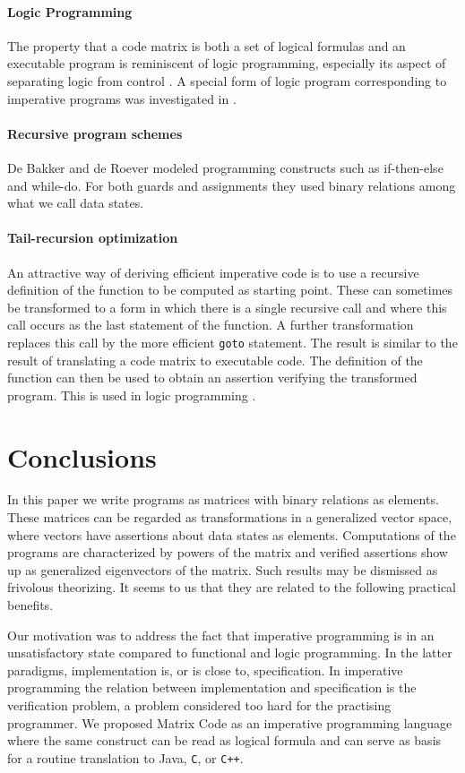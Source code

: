 \documentclass[preprint,11pt]{elsarticle}
\begin{document}
\paragraph{Logic Programming}
The property that a code matrix is both a set of logical formulas
and an executable program is reminiscent of logic programming,
especially its aspect of separating logic from control
\cite{kwl79a}.
A special form of logic program corresponding to imperative
programs was investigated in \cite{cvn81}.

\paragraph{Recursive program schemes}
De Bakker and de Roever \cite{ddr73}
modeled programming constructs such as if-then-else and while-do.
For both guards and assignments they used binary relations
among what we call data states.

\paragraph{Tail-recursion optimization}
An attractive way of deriving efficient imperative code
is to use a recursive
definition of the function to be computed as starting point.
These can sometimes be transformed to a form
in which there is a single recursive call
and where this call occurs as the last statement
of the function. A further transformation replaces this call
by the more efficient {\tt goto} statement.
The result is similar to the result of translating
a code matrix to executable code.
The definition of the function can then be used to obtain
an assertion verifying the transformed program.
This is used in logic programming \cite{cvn81}.

\section{Conclusions}

In this paper we write programs as matrices with
binary relations as elements.
These matrices can be regarded as transformations
in a generalized vector space,
where vectors have assertions about data states as elements.
Computations of the programs are characterized by
powers of the matrix and verified assertions
show up as generalized eigenvectors of the matrix.
Such results may be dismissed as frivolous theorizing.
It seems to us that they are related to the following practical
benefits.

Our motivation was to address
the fact that imperative programming is in an unsatisfactory
state compared to functional and logic programming.
In the latter paradigms,
implementation is, or is close to, specification.
In imperative programming the relation between implementation
and specification is the verification problem,
a problem considered too hard for the practising programmer.
We proposed Matrix Code as an imperative programming language
where the same construct can be read as logical formula
and can serve as basis for a routine translation to Java,
\verb"C", or \verb"C++".
\end{document}
